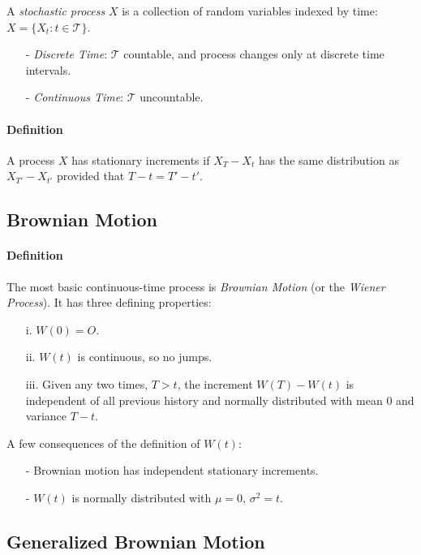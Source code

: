 \documentclass[12pt]{article}
\theoremstyle{plain}
\theoremstyle{definition}
\theoremstyle{remark}
\begin{document}
A \emph{stochastic process} $X$ is a collection of random variables
indexed by time: $X = \{ X_t: t \in \mathcal{T} \}$.
\begin{itemize}
   \item[-]{\emph{Discrete Time}: $\mathcal{T}$ countable, and process
      changes only at discrete time intervals.}
   \item[-]{\emph{Continuous Time}: $\mathcal{T}$ uncountable.}
\end{itemize}
\paragraph{Definition} A process $X$ has stationary increments if
$X_T - X_t$ has the same distribution as $X_{T'} - X_{t'}$ provided
that $T-t= T'-t'$.

\subsection{Brownian Motion}

\paragraph{Definition} The most basic continuous-time process is
\emph{Brownian Motion} (or the \emph{Wiener Process}).  It has three
defining properties:
\begin{enumerate}
   \item[i.]{$W(0) = O$.}
   \item[ii.]{$W(t)$ is continuous, so no jumps.}
   \item[iii.]{Given any two times, $T>t$, the increment $W(T) - W(t)$ is
      independent of all previous history and normally distributed
      with mean $0$ and variance $T-t$.}
\end{enumerate}
A few consequences of the definition of $W(t)$:
\begin{itemize}
   \item[-]{Brownian motion has independent stationary increments.}
   \item[-]{$W(t)$ is normally distributed with $\mu =0$, $\sigma^2 = t$.
      }
\end{itemize}

\subsection{Generalized Brownian Motion}
\end{document}
